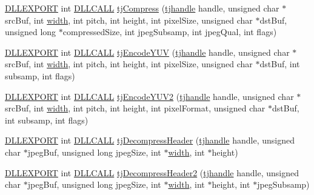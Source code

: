 \begin{DoxyCompactItemize}
\item 
\hyperlink{turbojpeg_8h_a808e08638be3cba36e36759e5b150de0}{D\+L\+L\+E\+X\+P\+O\+RT} int \hyperlink{turbojpeg_8h_a54b25836118bfac94a53a7b790f3ccb2}{D\+L\+L\+C\+A\+LL} \hyperlink{group___turbo_j_p_e_g_ga32d6c78addd3ebbcbb34307bbf77be69}{tj\+Compress} (\hyperlink{group___turbo_j_p_e_g_ga758d2634ecb4949de7815cba621f5763}{tjhandle} handle, unsigned char $\ast$src\+Buf, int \hyperlink{png_8h_ad46179dbe9c68fdcea52b34c3480ec0f}{width}, int pitch, int height, int pixel\+Size, unsigned char $\ast$dst\+Buf, unsigned long $\ast$compressed\+Size, int jpeg\+Subsamp, int jpeg\+Qual, int flags)
\item 
\hyperlink{turbojpeg_8h_a808e08638be3cba36e36759e5b150de0}{D\+L\+L\+E\+X\+P\+O\+RT} int \hyperlink{turbojpeg_8h_a54b25836118bfac94a53a7b790f3ccb2}{D\+L\+L\+C\+A\+LL} \hyperlink{group___turbo_j_p_e_g_ga7a1c4f05a7afdff37f5afec29367486b}{tj\+Encode\+Y\+UV} (\hyperlink{group___turbo_j_p_e_g_ga758d2634ecb4949de7815cba621f5763}{tjhandle} handle, unsigned char $\ast$src\+Buf, int \hyperlink{png_8h_ad46179dbe9c68fdcea52b34c3480ec0f}{width}, int pitch, int height, int pixel\+Size, unsigned char $\ast$dst\+Buf, int subsamp, int flags)
\item 
\hyperlink{turbojpeg_8h_a808e08638be3cba36e36759e5b150de0}{D\+L\+L\+E\+X\+P\+O\+RT} int \hyperlink{turbojpeg_8h_a54b25836118bfac94a53a7b790f3ccb2}{D\+L\+L\+C\+A\+LL} \hyperlink{group___turbo_j_p_e_g_ga0fa4e7b1943687c6a0c0304529c55d35}{tj\+Encode\+Y\+U\+V2} (\hyperlink{group___turbo_j_p_e_g_ga758d2634ecb4949de7815cba621f5763}{tjhandle} handle, unsigned char $\ast$src\+Buf, int \hyperlink{png_8h_ad46179dbe9c68fdcea52b34c3480ec0f}{width}, int pitch, int height, int pixel\+Format, unsigned char $\ast$dst\+Buf, int subsamp, int flags)
\item 
\hyperlink{turbojpeg_8h_a808e08638be3cba36e36759e5b150de0}{D\+L\+L\+E\+X\+P\+O\+RT} int \hyperlink{turbojpeg_8h_a54b25836118bfac94a53a7b790f3ccb2}{D\+L\+L\+C\+A\+LL} \hyperlink{group___turbo_j_p_e_g_gaeebe190e6ce53c53760307ba86832626}{tj\+Decompress\+Header} (\hyperlink{group___turbo_j_p_e_g_ga758d2634ecb4949de7815cba621f5763}{tjhandle} handle, unsigned char $\ast$jpeg\+Buf, unsigned long jpeg\+Size, int $\ast$\hyperlink{png_8h_ad46179dbe9c68fdcea52b34c3480ec0f}{width}, int $\ast$height)
\item 
\hyperlink{turbojpeg_8h_a808e08638be3cba36e36759e5b150de0}{D\+L\+L\+E\+X\+P\+O\+RT} int \hyperlink{turbojpeg_8h_a54b25836118bfac94a53a7b790f3ccb2}{D\+L\+L\+C\+A\+LL} \hyperlink{group___turbo_j_p_e_g_gac5675fceb7997b385516cdffdb34e6aa}{tj\+Decompress\+Header2} (\hyperlink{group___turbo_j_p_e_g_ga758d2634ecb4949de7815cba621f5763}{tjhandle} handle, unsigned char $\ast$jpeg\+Buf, unsigned long jpeg\+Size, int $\ast$\hyperlink{png_8h_ad46179dbe9c68fdcea52b34c3480ec0f}{width}, int $\ast$height, int $\ast$jpeg\+Subsamp)

\end{DoxyCompactItemize}
